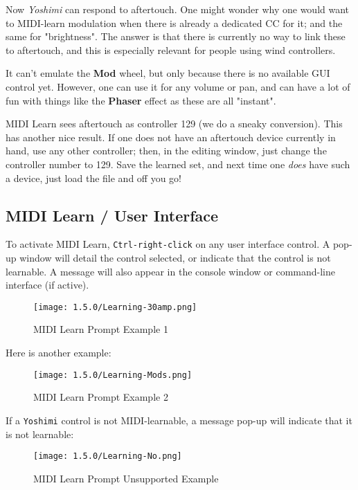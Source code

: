    Now \textsl{Yoshimi} can respond to aftertouch.
   One might wonder why one would want to MIDI-learn modulation when there is
   already a dedicated CC for it; and the same for "brightness". The answer is
   that there is currently no way to link these to aftertouch, and this is
   especially relevant for people using wind controllers.

   It can't emulate the \textbf{Mod} wheel, but only because there is no
   available GUI control yet.  However, one can use it for any volume or pan, and
   can have a lot of fun with things like the \textbf{Phaser} effect as these are
   all "instant".

   MIDI Learn sees aftertouch as controller 129 (we do a sneaky conversion). This
   has another nice result. If one does not have an aftertouch device currently
   in hand, use any other controller; then, in the editing window, just change the
   controller number to 129. Save the learned set, and next time one
   \textsl{does} have such a device, just load the file and off you go!

\subsection{MIDI Learn / User Interface}
\label{subsec:midi_learn_user_interface}

   To activate MIDI Learn, \texttt{Ctrl-right-click}
   on any user interface control.
   A pop-up window will detail the control selected, or indicate that the
   control is not learnable.
   A message will also appear in the console window or command-line interface
   (if active).

\begin{figure}[H]
   \centering 
   \texttt{[image: 1.5.0/Learning-30amp.png]}
   \caption{MIDI Learn Prompt Example 1}
   \label{fig:midi_learn_ex_1}
\end{figure}

   Here is another example:

\begin{figure}[H]
   \centering 
   \texttt{[image: 1.5.0/Learning-Mods.png]}
   \caption{MIDI Learn Prompt Example 2}
   \label{fig:midi_learn_ex_2}
\end{figure}

   If a \texttt{Yoshimi} control is not MIDI-learnable, a message pop-up
   will indicate that it is not
   learnable:

\begin{figure}[H]
   \centering 
   \texttt{[image: 1.5.0/Learning-No.png]}
   \caption{MIDI Learn Prompt Unsupported Example}
   \label{fig:midi_learn_unsupported}
\end{figure}

